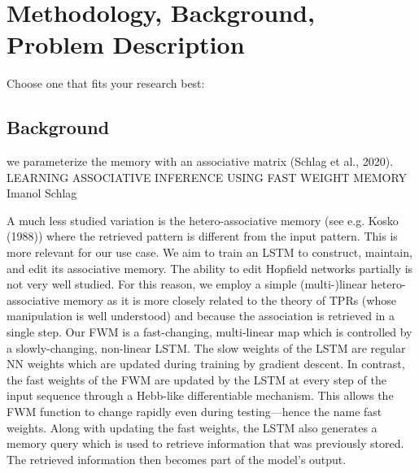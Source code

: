 \section{Methodology, Background, Problem Description}
Choose one that fits your research best:
\subsection{Background}



we parameterize the memory with an associative matrix (Schlag et al., 2020). 
LEARNING ASSOCIATIVE INFERENCE USING FAST WEIGHT MEMORY Imanol Schlag

A much less studied variation is the hetero-associative memory (see e.g. Kosko (1988)) where the retrieved pattern is different from the input pattern. This is more relevant for our use case.
We aim to train an LSTM to construct, maintain, and edit its associative memory. The ability to edit Hopfield networks partially is not very well studied. For this reason, we employ a simple (multi-)linear
hetero-associative memory as it is more closely related to the theory of TPRs (whose manipulation is well understood) and because the association is retrieved in a single step.
Our FWM is a fast-changing, multi-linear map which is controlled by a slowly-changing, non-linear LSTM. The slow weights of the LSTM are regular NN weights which 
are updated during training by gradient descent. In contrast, the fast weights of the FWM are updated by the LSTM at every step of the input sequence through a Hebb-like differentiable mechanism. 
This allows the FWM function to change rapidly even during testing—hence the name fast weights. Along with updating the fast weights, 
the LSTM also generates a memory query which is used to retrieve information that was previously stored. The retrieved information then becomes part of the model’s output.


